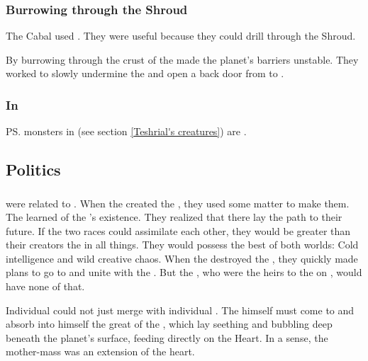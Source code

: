 \subsubsection{Burrowing through the Shroud}
The Cabal used \noggyaleth.
They were useful because they could drill through the Shroud. 

By burrowing through the crust of \Miith the \noggyaleth made the planet's barriers unstable. 
They worked to slowly undermine the \CrystalSphere and open a back door from \Miith to \Erebos.





\subsubsection{In \Malcur}
\ps{\Teshrial} monsters in \Malcur (see section \ref{Teshrial's creatures}) are \noggyaleth. 









\subsection{Politics}





\subsubsection{\Banes}
\Banes were related to \noggyaleth.
When the \voyagers created the \banes, they used some \noggyal matter to make them.
The \banekings learned of the \noggyaleth's existence.
They realized that there lay the path to their future.
If the two races could assimilate each other, they would be greater than their creators the \voyagers in all things.
They would possess the best of both worlds: 
Cold intelligence and wild creative chaos.
When the \banes destroyed the \voyagers, they quickly made plans to go to \Miith and unite with the \noggyaleth.
But the \ophidians, who were the heirs to the \voyagers on \Miith, would have none of that.

Individual \banes could not just merge with individual \noggyaleth.
The \baneking himself must come to \Miith and absorb into himself the great  of the \noggyaleth, which lay seething and bubbling deep beneath the planet's surface, feeding directly on the Heart.
In a sense, the \noggyal mother-mass was an extension of the heart.





